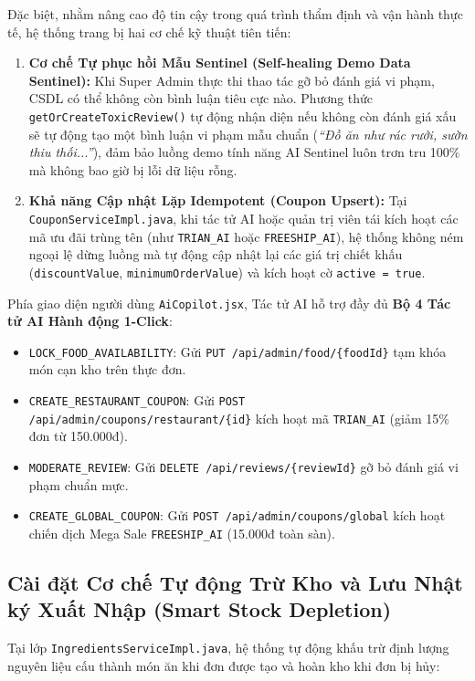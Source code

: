 \documentclass{uetgraduation}
\begin{document}
Đặc biệt, nhằm nâng cao độ tin cậy trong quá trình thẩm định và vận hành thực tế, hệ thống trang bị hai cơ chế kỹ thuật tiên tiến:
\begin{enumerate}
    \item \textbf{Cơ chế Tự phục hồi Mẫu Sentinel (Self-healing Demo Data Sentinel):} Khi Super Admin thực thi thao tác gỡ bỏ đánh giá vi phạm, CSDL có thể không còn bình luận tiêu cực nào. Phương thức \texttt{getOrCreateToxicReview()} tự động nhận diện nếu không còn đánh giá xấu sẽ tự động tạo một bình luận vi phạm mẫu chuẩn (\textit{``Đồ ăn như rác rưởi, sườn thiu thối...''}), đảm bảo luồng demo tính năng AI Sentinel luôn trơn tru 100\% mà không bao giờ bị lỗi dữ liệu rỗng.
    \item \textbf{Khả năng Cập nhật Lặp Idempotent (Coupon Upsert):} Tại \texttt{CouponServiceImpl.java}, khi tác tử AI hoặc quản trị viên tái kích hoạt các mã ưu đãi trùng tên (như \texttt{TRIAN\_AI} hoặc \texttt{FREESHIP\_AI}), hệ thống không ném ngoại lệ dừng luồng mà tự động cập nhật lại các giá trị chiết khấu (\texttt{discountValue}, \texttt{minimumOrderValue}) và kích hoạt cờ \texttt{active = true}.
\end{enumerate}

Phía giao diện người dùng \texttt{AiCopilot.jsx}, Tác tử AI hỗ trợ đầy đủ \textbf{Bộ 4 Tác tử AI Hành động 1-Click}:
\begin{itemize}
    \item \texttt{LOCK\_FOOD\_AVAILABILITY}: Gửi \texttt{PUT /api/admin/food/\{foodId\}} tạm khóa món cạn kho trên thực đơn.
    \item \texttt{CREATE\_RESTAURANT\_COUPON}: Gửi \texttt{POST /api/admin/coupons/restaurant/\{id\}} kích hoạt mã \texttt{TRIAN\_AI} (giảm 15\% đơn từ 150.000đ).
    \item \texttt{MODERATE\_REVIEW}: Gửi \texttt{DELETE /api/reviews/\{reviewId\}} gỡ bỏ đánh giá vi phạm chuẩn mực.
    \item \texttt{CREATE\_GLOBAL\_COUPON}: Gửi \texttt{POST /api/admin/coupons/global} kích hoạt chiến dịch Mega Sale \texttt{FREESHIP\_AI} (15.000đ toàn sàn).
\end{itemize}

\subsection{Cài đặt Cơ chế Tự động Trừ Kho và Lưu Nhật ký Xuất Nhập (Smart Stock Depletion)}
Tại lớp \texttt{IngredientsServiceImpl.java}, hệ thống tự động khấu trừ định lượng nguyên liệu cấu thành món ăn khi đơn được tạo và hoàn kho khi đơn bị hủy:
\end{document}
